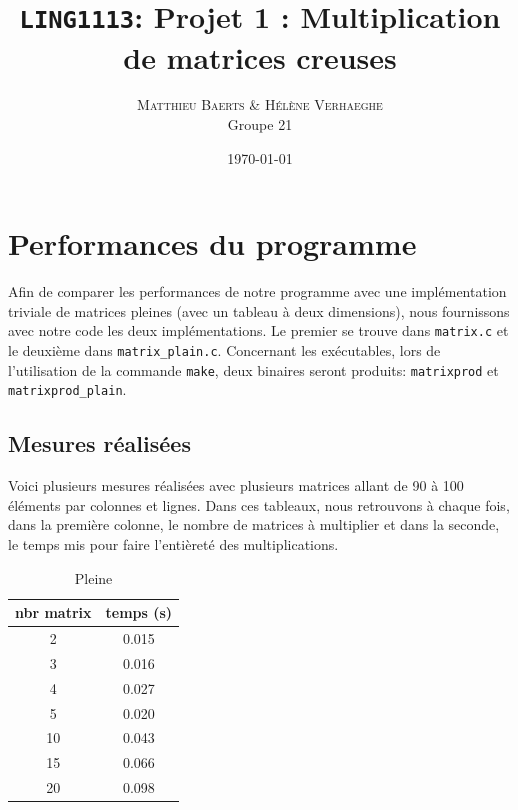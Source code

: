 \documentclass[a4paper]{scrartcl}
\date{\today} %
\title{\texttt{LING1113}: Projet 1 : Multiplication de matrices creuses}
\author{\textsc{Matthieu Baerts} \& \textsc{Hélène Verhaeghe}\\Groupe 21}
\begin{document}
\maketitle
\section{Performances du programme}
Afin de comparer les performances de notre programme avec une implémentation triviale de matrices pleines (avec un tableau à deux dimensions), nous fournissons avec notre code les deux implémentations. Le premier se trouve dans \texttt{matrix.c} et le deuxième dans \texttt{matrix\_plain.c}. Concernant les exécutables, lors de l'utilisation de la commande \texttt{make}, deux binaires seront produits: \texttt{matrixprod} et \texttt{matrixprod\_plain}.
\subsection{Mesures réalisées}
Voici plusieurs mesures réalisées avec plusieurs matrices allant de 90 à 100 éléments par colonnes et lignes. Dans ces tableaux, nous retrouvons à chaque fois, dans la première colonne, le nombre de matrices à multiplier et dans la seconde, le temps mis pour faire l'entièreté des multiplications. 
\begin{table}[H]
    \caption{Pleine}
    \label{tab:10}
    \begin{center}
        \begin{tabular}{cc}
             nbr matrix & temps (s)\\
            \hline
            2 &        0.015 \\

    3 &        0.016 \\

    4 &        0.027 \\

    5 &        0.020 \\

    10 &        0.043\\

    15 &        0.066 \\

    20 &        0.098 \\

        \end{tabular}
    \end{center}
\end{table}
\end{document}
